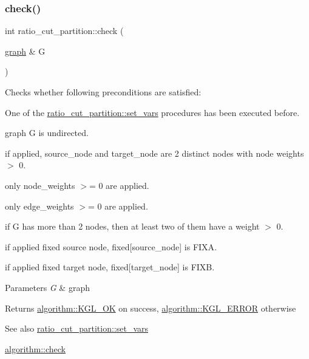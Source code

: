 \subsubsection{\texorpdfstring{check()}{check()}}
{\footnotesize\ttfamily int ratio\+\_\+cut\+\_\+partition\+::check (\begin{DoxyParamCaption}\item[{\mbox{\hyperlink{classgraph}{graph}} \&}]{G }\end{DoxyParamCaption})\hspace{0.3cm}{\ttfamily [virtual]}}

Checks whether following preconditions are satisfied\+: 
\begin{DoxyItemize}
\item One of the \mbox{\hyperlink{classratio__cut__partition_a4c143f82aac5fee3b955414ab7d6ce19}{ratio\+\_\+cut\+\_\+partition\+::set\+\_\+vars}} procedures has been executed before. 
\item graph {\ttfamily G} is undirected. 
\item if applied, {\ttfamily source\+\_\+node} and {\ttfamily target\+\_\+node } are 2 distinct nodes with node weights $>$ 0. 
\item only node\+\_\+weights $>$= 0 are applied. 
\item only edge\+\_\+weights $>$= 0 are applied. 
\item if {\ttfamily G} has more than 2 nodes, then at least two of them have a weight $>$ 0. 
\item if applied fixed source node, {\ttfamily fixed\mbox{[}source\+\_\+node\mbox{]} } is {\ttfamily F\+I\+XA}. 
\item if applied fixed target node, {\ttfamily fixed\mbox{[}target\+\_\+node\mbox{]} } is {\ttfamily F\+I\+XB}. 
\end{DoxyItemize}


\begin{DoxyParams}{Parameters}
{\em G} & graph \\
\hline
\end{DoxyParams}
\begin{DoxyReturn}{Returns}
{\ttfamily \mbox{\hyperlink{classalgorithm_af1a0078e153aa99c24f9bdf0d97f6710aae4c1cd7fe8d8cf4b143241a6e7c31cf}{algorithm\+::\+K\+G\+L\+\_\+\+OK}}} on success, {\ttfamily \mbox{\hyperlink{classalgorithm_af1a0078e153aa99c24f9bdf0d97f6710ae67bf27b2ef31f73e545a7f9f4a69556}{algorithm\+::\+K\+G\+L\+\_\+\+E\+R\+R\+OR}}} otherwise 
\end{DoxyReturn}
\begin{DoxySeeAlso}{See also}
\mbox{\hyperlink{classratio__cut__partition_a4c143f82aac5fee3b955414ab7d6ce19}{ratio\+\_\+cut\+\_\+partition\+::set\+\_\+vars}} 

\mbox{\hyperlink{classalgorithm_a76361fb03ad1cf643affc51821e43bed}{algorithm\+::check}} 
\end{DoxySeeAlso}


